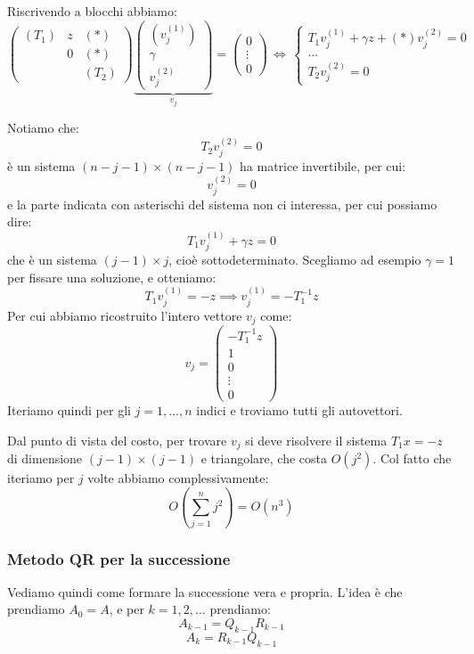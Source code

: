 \documentclass[a4paper,11pt]{article}
\begin{document}
Riscrivendo a blocchi abbiamo:
$$
\begin{pmatrix}
	(T_1) & z & (*) \\ 
				& 0 & (*)  \\ 
				& & (T_2)
\end{pmatrix}
\underbrace{
\begin{pmatrix}
	(v_j^{(1)}) \\ \gamma \\ v_{j}^{(2)} 
\end{pmatrix}
}_{v_j}
=
\begin{pmatrix}
	0 \\ \vdots \\ 0
\end{pmatrix}
\, \Leftrightarrow \,
\begin{cases}
	T_1 v_j^{(1)} + \gamma z + (*) v_j^{(2)} = 0 \\ 
	... \\ 
	T_2 v_j^{(2)} = 0
\end{cases}
$$

Notiamo che:
$$
T_2 v_j^{(2)} = 0
$$
è un sistema $(n - j - 1) \times (n - j - 1)$ ha matrice invertibile, per cui:
$$
v_j^{(2)} = 0
$$
e la parte indicata con asterischi del sistema non ci interessa, per cui possiamo dire:
$$
T_1 v_j^{(1)} + \gamma z = 0
$$
che è un sistema $(j - 1) \times j$, cioè sottodeterminato.
Scegliamo ad esempio $\gamma = 1$ per fissare una soluzione, e otteniamo:
$$
T_1 v_j^{(1)} = -z \implies v_j^{(1)} = - T_1^{-1} z
$$
Per cui abbiamo ricostruito l'intero vettore $v_j$ come:
$$
v_j =
\begin{pmatrix}
	-T_1^{-1} z \\ 
	1 \\ 
	0 \\
	\vdots \\ 
	0
\end{pmatrix}
$$
Iteriamo quindi per gli $j = 1, ..., n$ indici e troviamo tutti gli autovettori.

Dal punto di vista del costo, per trovare $v_j $ si deve risolvere il sistema $T_1 x = -z$ di dimensione $(j - 1) \times (j - 1)$ e triangolare, che costa $O(j^2)$.
Col fatto che iteriamo per $j$ volte abbiamo complessivamente:
$$
O\left( \sum_{j = 1}^n j^2 \right) = O(n^3)
$$

\subsubsection{Metodo QR per la successione}
Vediamo quindi come formare la successione vera e propria.
L'idea è che prendiamo $A_0 = A$, e per $k = 1, 2, ...$ prendiamo:
$$
A_{k - 1} = Q_{k - 1} R_{k - 1}
$$
$$
A_k = R_{k - 1} Q_{k - 1}
$$
\end{document}
